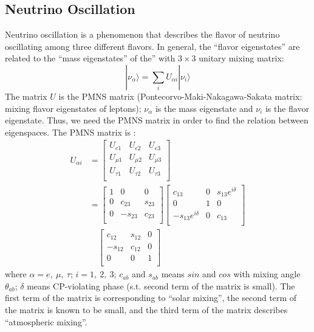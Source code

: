 \documentclass[12pt]{article}
\begin{document}
\begin{multicols}{2}
    \subsection{Neutrino Oscillation}
        Neutrino oscillation is a phenomenon that describes the flavor of neutrino oscillating among three different flavors. In general, the ``flavor eigenstates'' are related to the ``mass eigenstates'' of the'' with $3 \times 3$ unitary mixing matrix:
        \[
            | \nu_{\alpha} \rangle = \sum_{i} U_{\alpha i} | \nu_{i} \rangle
        \]
        The matrix $U$ is the PMNS matrix (Pontecorvo-Maki-Nakagawa-Sakata matrix: mixing flavor eigenstates of leptons); $\nu_\alpha$ is the mass eigenstate and $\nu_i$ is the flavor eigenstate. Thus, we need the PMNS matrix in order to find the relation between eigenspaces. The PMNS matrix is \cite{SKexp} \cite{wiki}:
        \begin{align*}
            U_{\alpha i} &= 
            \begin{bmatrix}
                U_{e1}     & U_{e2}     & U_{e3}    \\
                U_{\mu 1}  & U_{\mu 2}  & U_{\mu 3} \\
                U_{\tau 1} & U_{\tau 2} & U_{\tau 3}\\
            \end{bmatrix}\\
            &=
            \begin{bmatrix}
                1 & 0       & 0     \\
                0 & c_{23}  & s_{23}\\
                0 & -s_{23} & c_{23}\\
            \end{bmatrix}
            \begin{bmatrix}
                c_{13}             & 0 & s_{13}e^{i\delta}\\
                0                  & 1 & 0                \\
                -s_{13}e^{i\delta} & 0 & c_{13}           \\
            \end{bmatrix}\\
            &\quad
            \begin{bmatrix}
                c_{12}  & s_{12} & 0\\
                -s_{12} & c_{12} & 0\\
                0       & 0      & 1\\
            \end{bmatrix}
        \end{align*}
        where $\alpha = e,\ \mu,\ \tau$; $i = 1,\ 2,\ 3$; $c_{ab}$ and $s_{ab}$ means $sin$ and $cos$ with mixing angle $\theta_{ab}$; $\delta$ means CP-violating phase (s.t. second term of the matrix is small). The first term of the matrix is corresponding to ``solar mixing'', the second term of the matrix is known to be small, and the third term of the matrix describes ``atmospheric mixing''.


\end{multicols}
\end{document}
